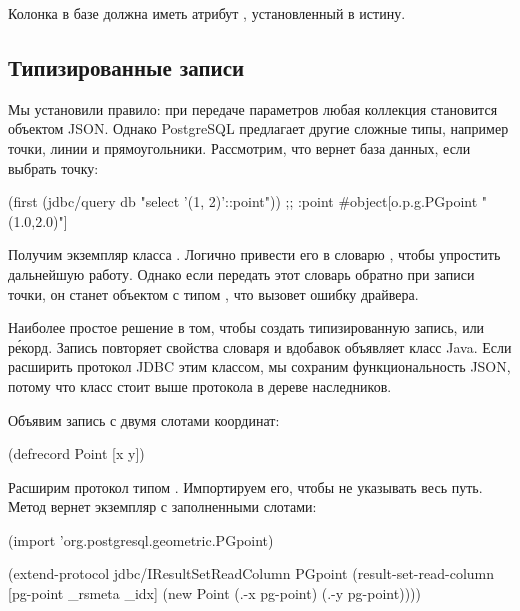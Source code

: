 Колонка в базе должна иметь атрибут , установленный в истину.

\subsection{Типизированные записи}

Мы установили правило: при передаче параметров любая коллекция становится объектом JSON. Однако PostgreSQL предлагает другие сложные типы, например точки, линии и прямоугольники. Рассмотрим, что вернет база данных, если выбрать точку:

\begin{english}
  \begin{clojure}
(first (jdbc/query db "select '(1, 2)'::point"))
;; {:point #object[o.p.g.PGpoint "(1.0,2.0)"]}
  \end{clojure}
\end{english}

Получим экземпляр класса . Логично привести его в словарю , чтобы упростить дальнейшую работу. Однако если передать этот словарь обратно при записи точки, он станет объектом  с типом , что вызовет ошибку драйвера.

Наиболее простое решение в том, чтобы создать типизированную запись, или р\'{е}корд. Запись повторяет свойства словаря и вдобавок объявляет класс Java. Если расширить протокол JDBC этим классом, мы сохраним функциональность JSON, потому что класс стоит выше протокола  в дереве наследников.

Объявим запись с двумя слотами координат:

\begin{english}
  \begin{clojure}
(defrecord Point [x y])
  \end{clojure}
\end{english}

Расширим протокол  типом . Импортируем его, чтобы не указывать весь путь. Метод  вернет экземпляр  с заполненными слотами:

\begin{english}
  \begin{clojure}
(import 'org.postgresql.geometric.PGpoint)

(extend-protocol jdbc/IResultSetReadColumn
  PGpoint
  (result-set-read-column [pg-point _rsmeta _idx]
    (new Point (.-x pg-point) (.-y pg-point))))
  \end{clojure}
\end{english}

